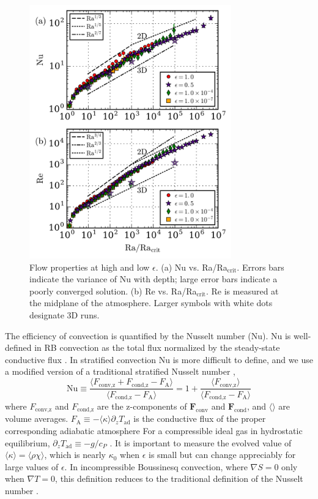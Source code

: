 \documentclass[aps, prl, twocolumn, nofootinbib, groupedaddress, amsfonts, amssymb, amsmath]{revtex4-1}
\newcommand{\grad}{\ensuremath{\nabla}}
\begin{document}
\begin{figure}[t]
\includegraphics[width=3.4375in]{./figs/re_and_nu_v_Ra.png}
\caption{
Flow properties at high and low $\epsilon$. 
(a) Nu vs. Ra/Ra$_{\text{crit}}$.
Errors bars indicate the variance of Nu with depth;
large error bars indicate a poorly converged solution.
(b) Re vs. Ra/Ra$_{\text{crit}}$.
Re is measured at the midplane of the atmosphere.
Larger symbols with white dots designate 3D runs.
 \label{fig:re_and_nu_v_ra}
}
\end{figure}

The efficiency of convection is quantified by the Nusselt number (Nu).  
Nu is well-defined in RB convection
as the total flux normalized by the steady-state conductive flux 
\cite{johnston&doering2009, otero&all2002}.
In stratified convection Nu is more difficult to define, and we use
a modified version of a traditional stratified Nusselt number 
\cite{graham1975,hurlburt&all1984},
\begin{equation}
\text{Nu} \equiv \frac{\langle F_{\text{conv,z}} + F_{\text{cond,z}} - F_{\text{A}}\rangle}
{\langle F_{\text{cond,z}} - F_{\text{A}}\rangle} 
= 1 + \frac{\langle F_{\text{conv,z}}\rangle}{\langle F_{\text{cond,z}} - F_{\text{A}} \rangle}
\label{eqn:nusselt}
\end{equation}
where $F_{\text{conv,z}}$ and $F_{\text{cond,z}}$ are the 
z-components of $\bm{F}_{\text{conv}}$ and $\bm{F}_{\text{cond}}$,
and $\langle \rangle$ are volume averages.  
$F_{\text{A}} \equiv -\langle\kappa\rangle \partial_z T_{\text{ad}}$ 
is the conductive flux of the proper corresponding adiabatic atmosphere
For a compressible ideal gas in hydrostatic equilibrium,
$\partial_z T_{\text{ad}} \equiv - g / c_{P}$ \cite{spiegel&veronis1960}.  
It is important to measure the evolved value of
$\langle \kappa \rangle = \langle \rho\chi \rangle$, which is nearly
$\kappa_0$ when $\epsilon$ is small but can change appreciably for large
values of $\epsilon$.
In incompressible Boussinesq convection, where $\grad S = 0$ only when 
$\grad T = 0$, this definition reduces to the traditional definition
of the Nusselt number \cite{otero&all2002, johnston&doering2009}.
\end{document}
